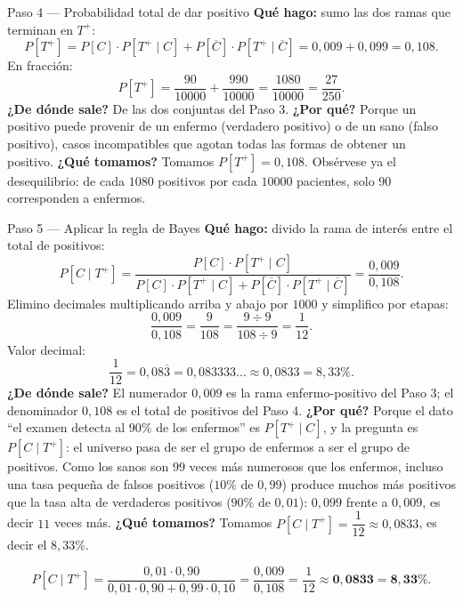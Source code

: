 \documentclass[11pt]{article}
\begin{document}
\begin{sol}
\begin{paso}{Paso 4 --- Probabilidad total de dar positivo}
\textbf{Qu\'e hago:} sumo las dos ramas que terminan en $T^{+}$:
\[
P[T^{+}]=P[C]\cdot P[T^{+}\mid C]+P[\overline{C}]\cdot P[T^{+}\mid \overline{C}]=0{,}009+0{,}099=0{,}108 .
\]
En fracci\'on:
\[
P[T^{+}]=\frac{90}{10000}+\frac{990}{10000}=\frac{1080}{10000}=\frac{27}{250}.
\]
\textbf{¿De d\'onde sale?} De las dos conjuntas del Paso 3.
\textbf{¿Por qu\'e?} Porque un positivo puede provenir de un enfermo (verdadero positivo) o de un sano (falso positivo), casos incompatibles que agotan todas las formas de obtener un positivo.
\textbf{¿Qu\'e tomamos?} Tomamos $P[T^{+}]=0{,}108$. Obs\'ervese ya el desequilibrio: de cada $1080$ positivos por cada $10000$ pacientes, solo $90$ corresponden a enfermos.
\end{paso}

\begin{paso}{Paso 5 --- Aplicar la regla de Bayes}
\textbf{Qu\'e hago:} divido la rama de inter\'es entre el total de positivos:
\[
P[C\mid T^{+}]=\frac{P[C]\cdot P[T^{+}\mid C]}{P[C]\cdot P[T^{+}\mid C]+P[\overline{C}]\cdot P[T^{+}\mid \overline{C}]}
=\frac{0{,}009}{0{,}108}.
\]
Elimino decimales multiplicando arriba y abajo por $1000$ y simplifico por etapas:
\[
\frac{0{,}009}{0{,}108}=\frac{9}{108}=\frac{9\div 9}{108\div 9}=\frac{1}{12}.
\]
Valor decimal:
\[
\frac{1}{12}=0{,}08\overline{3}=0{,}083333\ldots\approx 0{,}0833=8{,}33\% .
\]
\textbf{¿De d\'onde sale?} El numerador $0{,}009$ es la rama enfermo-positivo del Paso 3; el denominador $0{,}108$ es el total de positivos del Paso 4.
\textbf{¿Por qu\'e?} Porque el dato ``el examen detecta al $90\%$ de los enfermos'' es $P[T^{+}\mid C]$, y la pregunta es $P[C\mid T^{+}]$: el universo pasa de ser el grupo de enfermos a ser el grupo de positivos. Como los sanos son $99$ veces m\'as numerosos que los enfermos, incluso una tasa peque\~na de falsos positivos ($10\%$ de $0{,}99$) produce muchos m\'as positivos que la tasa alta de verdaderos positivos ($90\%$ de $0{,}01$): $0{,}099$ frente a $0{,}009$, es decir $11$ veces m\'as.
\textbf{¿Qu\'e tomamos?} Tomamos $P[C\mid T^{+}]=\dfrac{1}{12}\approx 0{,}0833$, es decir el $8{,}33\%$.
\end{paso}

\end{sol}

\begin{resp}
\[
P[C\mid T^{+}]=\frac{0{,}01\cdot 0{,}90}{0{,}01\cdot 0{,}90+0{,}99\cdot 0{,}10}=\frac{0{,}009}{0{,}108}=\frac{1}{12}\approx \mathbf{0{,}0833}=\mathbf{8{,}33\%}.
\]
\end{resp}
\end{document}
